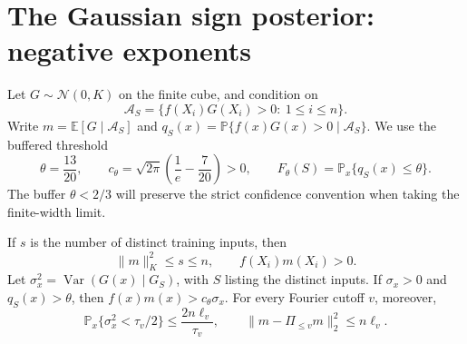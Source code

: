 \section{The Gaussian sign posterior: negative exponents}
\label{sec:negative-gamma}

Let $G\sim\mathcal N(0,K)$ on the finite cube, and condition on
\[
 \mathcal A_S=\{f(X_i)G(X_i)>0:\ 1\le i\le n\}.
\]
Write $m=\mathbb E[G\mid\mathcal A_S]$ and
$q_S(x)=\mathbb P\{f(x)G(x)>0\mid\mathcal A_S\}$.
We use the buffered threshold
\[
 \theta=\frac{13}{20},\qquad
 c_\theta=\sqrt{2\pi}\left(\frac1e-\frac7{20}\right)>0,
 \qquad F_\theta(S)=\mathbb P_x\{q_S(x)\le\theta\}.
\]
The buffer $\theta<2/3$ will preserve the strict confidence convention
when taking the finite-width limit.

\begin{lemma}
\label{lem:negative-mean-confidence}
If $s$ is the number of distinct training inputs, then
\[
 \|m\|_K^2\le s\le n,\qquad f(X_i)m(X_i)>0.
\]
Let $\sigma_x^2=\operatorname{Var}(G(x)\mid G_S)$, with $S$ listing
the distinct inputs. If $\sigma_x>0$ and $q_S(x)>\theta$, then
$f(x)m(x)>c_\theta\sigma_x$.
For every Fourier cutoff $v$, moreover,
\begin{equation}\label{eq:negative-variance-tail}
 \mathbb P_x\{\sigma_x^2<\tau_v/2\}
       \le\frac{2n\ell_v}{\tau_v},
 \qquad
 \|m-\Pi_{\le v}m\|_2^2\le n\ell_v.
\end{equation}
\end{lemma}

